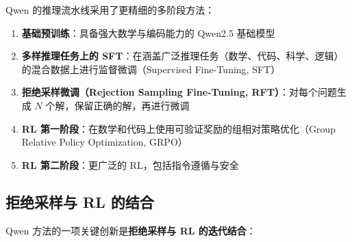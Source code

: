 Qwen 的推理流水线采用了更精细的多阶段方法：

\begin{enumerate}
  \item \textbf{基础预训练}：具备强大数学与编码能力的 Qwen2.5 基础模型
  \item \textbf{多样推理任务上的 SFT}：在涵盖广泛推理任务（数学、代码、科学、逻辑）的混合数据上进行监督微调（Supervised Fine-Tuning, SFT）
  \item \textbf{拒绝采样微调（Rejection Sampling Fine-Tuning, RFT）}：对每个问题生成 $N$ 个解，保留正确的解，再进行微调
  \item \textbf{RL 第一阶段}：在数学和代码上使用可验证奖励的组相对策略优化（Group Relative Policy Optimization, GRPO）
  \item \textbf{RL 第二阶段}：更广泛的 RL，包括指令遵循与安全
\end{enumerate}

\subsection{拒绝采样与 RL 的结合}
\label{rejection-sampling-rl-combination}

Qwen 方法的一项关键创新是\textbf{拒绝采样与 RL 的迭代结合}：

